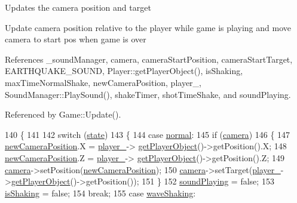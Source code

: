 Updates the camera position and target 

Update camera position relative to the player while game is playing and move camera to start pos when game is over 



 

 

References \-\_\-sound\-Manager, camera, camera\-Start\-Position, camera\-Start\-Target, E\-A\-R\-T\-H\-Q\-U\-A\-K\-E\-\_\-\-S\-O\-U\-N\-D, Player\-::get\-Player\-Object(), is\-Shaking, max\-Time\-Normal\-Shake, new\-Camera\-Position, player\-\_\-, Sound\-Manager\-::\-Play\-Sound(), shake\-Timer, shot\-Time\-Shake, and sound\-Playing.



Referenced by Game\-::\-Update().


\begin{DoxyCode}
140 \{
141 
142     \textcolor{keywordflow}{switch} (\hyperlink{class_camera_a87960570c2d28bd4471c5a74fc021cb5}{state})
143     \{
144     \textcolor{keywordflow}{case} \hyperlink{class_camera_a1ddf5d726e6c1d1d1c08d96d42c40236abb7299ba8c5dcce883fe6987df129b1c}{normal}:
145         \textcolor{keywordflow}{if} (\hyperlink{_camera_8cpp_a8920f7ea5f818f312fd7462dd96a3a50}{camera})
146         \{
147             \hyperlink{_camera_8cpp_a251c0afd6da69664ff234daccd5db458}{newCameraPosition}.X = \hyperlink{_camera_8cpp_a9aee5bc0df47d284a38a6b4da40a28a8}{player\_}->
      \hyperlink{class_player_a2914f817c2fe9b34984e6d90e8d5322f}{getPlayerObject}()->getPosition().X;
148             \hyperlink{_camera_8cpp_a251c0afd6da69664ff234daccd5db458}{newCameraPosition}.Z = \hyperlink{_camera_8cpp_a9aee5bc0df47d284a38a6b4da40a28a8}{player\_}->
      \hyperlink{class_player_a2914f817c2fe9b34984e6d90e8d5322f}{getPlayerObject}()->getPosition().Z;
149             \hyperlink{_camera_8cpp_a8920f7ea5f818f312fd7462dd96a3a50}{camera}->setPosition(\hyperlink{_camera_8cpp_a251c0afd6da69664ff234daccd5db458}{newCameraPosition});
150             \hyperlink{_camera_8cpp_a8920f7ea5f818f312fd7462dd96a3a50}{camera}->setTarget(\hyperlink{_camera_8cpp_a9aee5bc0df47d284a38a6b4da40a28a8}{player\_}->\hyperlink{class_player_a2914f817c2fe9b34984e6d90e8d5322f}{getPlayerObject}()->getPosition());
151         \}
152         \hyperlink{_camera_8cpp_a6b7c8d48813d1dd4aac53ba41d2b1981}{soundPlaying} = \textcolor{keyword}{false};
153         \hyperlink{_camera_8cpp_a45e54b24c28f7f9f93771bbc7fc65fe0}{isShaking} = \textcolor{keyword}{false};
154         \textcolor{keywordflow}{break};
155     \textcolor{keywordflow}{case} \hyperlink{class_camera_a1ddf5d726e6c1d1d1c08d96d42c40236a9bb1793c9685b74a790ea306a7852179}{waveShaking}:

\end{DoxyCode}
